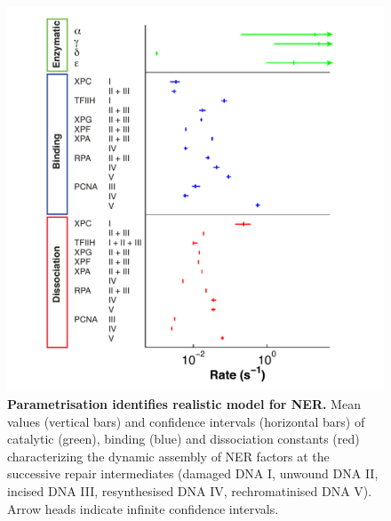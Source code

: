 \begin{figure}[htbp]
	\begin{center}
		\includegraphics[width=1\textwidth]{Abbildungen/figure2_9.pdf}
		\caption{\textbf{Parametrisation identifies realistic model for NER.} Mean values (vertical bars) and confidence intervals (horizontal bars) of catalytic (green), binding (blue) and dissociation constants (red) characterizing the dynamic assembly of NER factors at the successive repair intermediates (damaged DNA I, unwound DNA II, incised DNA III, resynthesised DNA IV, rechromatinised DNA V). Arrow heads indicate infinite confidence intervals.}
		\label{fig:PLE_NER_overview}
	\end{center}
\end{figure}

